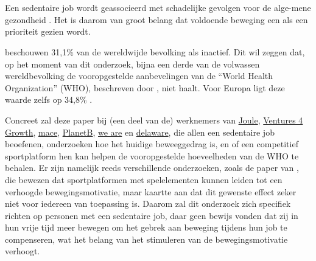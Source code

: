 
\chapter{}%
\label{ch:inleiding}


\section{}%
\label{sec:probleemstelling}

Een sedentaire job wordt geassocieerd met schadelijke gevolgen voor de alge-\linebreak mene gezondheid \autocite{Buckley2015}. Het is daarom van groot belang dat voldoende beweging een als een prioriteit gezien wordt.

\textcite{Hallal2012} beschouwen 31,1\% van de wereldwijde bevolking als inactief. Dit wil zeggen dat, op het moment van dit onderzoek, bijna een derde van de volwassen wereldbevolking de vooropgestelde aanbevelingen van de ``World Health Organization'' (WHO), beschreven door \textcite{Bull2020}, niet haalt. Voor Europa ligt deze waarde zelfs op 34,8\% \autocite{Bull2020}.

Concreet zal deze paper bij (een deel van de) werknemers van \href{https://en.joule.be/}{Joule}, \href{https://www.ventures4growth.com/en}{Ventures 4 Growth}, \href{https://www.mace-legal.com/}{mace}, \href{https://planetb.life/en}{PlanetB}, \href{https://www.we-are.be/}{we are} en \href{https://www.delaware.pro/en-be}{delaware}, die allen een sedentaire job beoefenen, onderzoeken hoe het huidige beweeggedrag is, en of een competitief sportplatform hen kan helpen de vooropgestelde hoeveelheden van de WHO te behalen. Er zijn namelijk reeds verschillende onderzoeken, zoals de paper van \textcite{Kari2016}, die bewezen dat sportplatformen met spelelementen kunnen leiden tot een verhoogde bewegingsmotivatie, maar \textcite{Hamari2013a} kaartte aan dat dit gewenste effect zeker niet voor iedereen van toepassing is. Daarom zal dit onderzoek zich specifiek richten op personen met een sedentaire job, daar \textcite{Vandelanotte2015} geen bewijs vonden dat zij in hun vrije tijd meer bewegen om het gebrek aan beweging tijdens hun job te compenseren, wat het belang van het stimuleren van de bewegingsmotivatie verhoogt.

